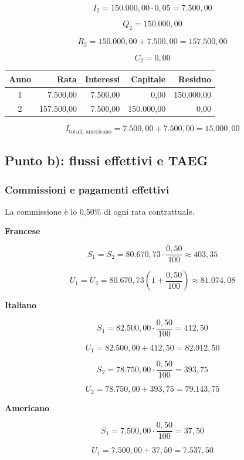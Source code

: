 \[
    I_2=150.000{,}00\cdot0{,}05=7.500{,}00
\]

\[
    Q_2=150.000{,}00
\]

\[
    R_2=150.000{,}00+7.500{,}00=157.500{,}00
\]

\[
    C_2=0{,}00
\]

\begin{center}
    \begin{tabular}{crrrr}
        \hline
        Anno & Rata & Interessi & Capitale & Residuo \\
        \hline
        1 & 7.500,00 & 7.500,00 & 0,00 & 150.000,00 \\
        2 & 157.500,00 & 7.500,00 & 150.000,00 & 0,00 \\
        \hline
    \end{tabular}
\end{center}

\[
    I_{\text{totali, americano}}
    =
    7.500{,}00+7.500{,}00
    =
    15.000{,}00
\]

\subsection{Punto b): flussi effettivi e TAEG}

\subsubsection*{Commissioni e pagamenti effettivi}

La commissione è lo 0,50\% di ogni rata contrattuale.

\textbf{Francese}

\[
    S_1=S_2
    =
    80.670{,}73\cdot\frac{0{,}50}{100}
    \approx403{,}35
\]

\[
    U_1=U_2
    =
    80.670{,}73
    \left(1+\frac{0{,}50}{100}\right)
    \approx81.074{,}08
\]

\textbf{Italiano}

\[
    S_1=82.500{,}00\cdot\frac{0{,}50}{100}
    =412{,}50
\]

\[
    U_1=82.500{,}00+412{,}50=82.912{,}50
\]

\[
    S_2=78.750{,}00\cdot\frac{0{,}50}{100}
    =393{,}75
\]

\[
    U_2=78.750{,}00+393{,}75=79.143{,}75
\]

\textbf{Americano}

\[
    S_1=7.500{,}00\cdot\frac{0{,}50}{100}=37{,}50
\]

\[
    U_1=7.500{,}00+37{,}50=7.537{,}50
\]

